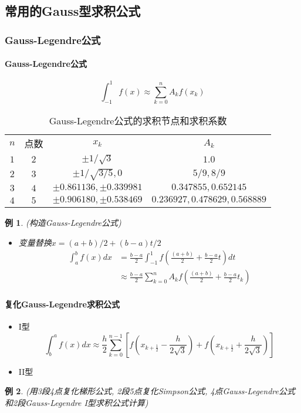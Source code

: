 \documentclass[twoside]{article}
\newtheorem{eg}{例}[section]
\begin{document}
\subsection{常用的Gauss型求积公式}
\subsubsection{Gauss-Legendre公式}
\paragraph{Gauss-Legendre公式}
\begin{equation}
  \int^1_{-1} f(x) \approx \sum^n_{k=0} A_k f(x_k)
\end{equation}
\begin{table}[htbp]
  \centering
  \caption{Gauss-Legendre公式的求积节点和求积系数}
  \begin{tabular}{cccc}
    \toprule
    $n$ & 点数 & $x_k$ & $A_k$ \\
    $1$ & $2$  & $\pm 1/\sqrt{3}$ & $1.0$ \\
    $2$ & $3$  & $\pm 1/\sqrt{3/5},0$ & $5/9, 8/9$ \\
    $3$ & $4$  & $\pm 0.861136, \pm 0.339981$ & $ 0.347855, 0.652145$\\
    $4$ & $5$  & $\pm 0.906180, \pm 0.538469$ & $0.236927, 0.478629, 0.568889$ \\
  \end{tabular}
\end{table}
\begin{eg}
  (构造Gauss-Legendre公式)
  \begin{itemize}
    \item 变量替换$x=(a+b)/2 + (b-a)t/2$
      \begin{equation}
        \begin{aligned}
          \int^b_a f(x)dx &= \frac{b-a}{2} \int^1_{-1} f(\frac{(a+b)}{2} + \frac{b-a}{2}t)dt \\
                          &\approx \frac{b-a}{2} \sum^n_{k=0} A_k f(\frac{(a+b)}{2} + \frac{b-a}{2}t_k)
        \end{aligned}
      \end{equation}
  \end{itemize}
\end{eg}
\paragraph{复化Gauss-Legendre求积公式}
\begin{itemize}
  \item I型
    \begin{equation}
      \int^a_b f(x)dx \approx \frac{h}{2} \sum^{n-1}_{k=0} [f(x_{k+\frac{1}{2}} - \frac{h}{2\sqrt{3}}) + f(x_{k+\frac{1}{2}} + \frac{h}{2\sqrt{3}})]
    \end{equation}
  \item II型
\end{itemize}
\begin{eg}
  (用3段4点复化梯形公式, 2段5点复化Simpson公式, 4点Gauss-Legendre公式和2段Gauss-Legendre I型求积公式计算)
\end{eg}
\end{document}
